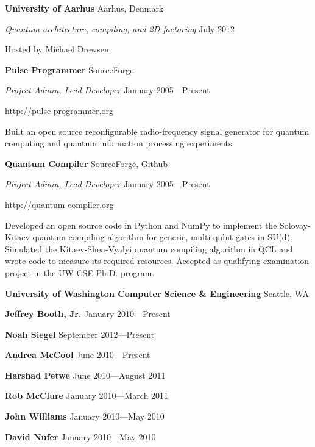 \documentclass[letter]{article}
\begin{document}
\vspace{\baselineskip}
\par
{\bf {University of Aarhus}} \hfill Aarhus, Denmark
\par
{\em Quantum architecture, compiling, and 2D factoring} \hfill July 2012
\par
Hosted by Michael Drewsen.

\vspace{\baselineskip}
\par
{\bf {Pulse Programmer}} \hfill SourceForge
\par
{\em Project Admin, Lead Developer} \hfill January 2005---Present
\par
\url{http://pulse-programmer.org}
\par
Built an open source reconfigurable radio-frequency signal generator
for quantum computing and quantum information processing experiments.

\vspace{\baselineskip}
\par
{\bf {Quantum Compiler}} \hfill SourceForge, Github
\par
{\em Project Admin, Lead Developer} \hfill January 2005---Present
\par
\url{http://quantum-compiler.org}
\par
Developed an open source code in Python and NumPy to implement the
Solovay-Kitaev quantum compiling algorithm for generic, multi-qubit gates
in SU(d). Simulated the Kitaev-Shen-Vyalyi quantum compiling algorithm in
QCL and wrote code to measure its required resources. Accepted as
qualifying examination project in the UW CSE Ph.D. program.

\vspace{\baselineskip}
\par
{\bf {University of Washington Computer Science \& Engineering}} \hfill Seattle, WA
\par
{\bf Jeffrey Booth, Jr.} \hfill January 2010---Present
\par
{\bf Noah Siegel} \hfill September 2012---Present
\par
{\bf Andrea McCool} \hfill June 2010---Present
\par
{\bf Harshad Petwe} \hfill June 2010---August 2011
\par
{\bf Rob McClure} \hfill January 2010---March 2011
\par
{\bf John Williams} \hfill January 2010---May 2010
\par
{\bf David Nufer} \hfill January 2010---May 2010
\end{document}
